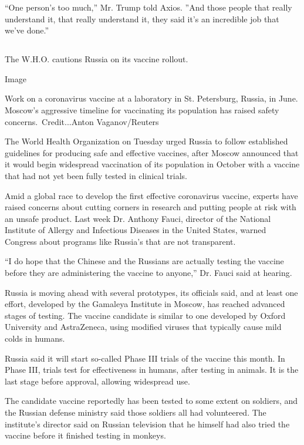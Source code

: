 ``One person's too much,'' Mr. Trump told Axios. ''And those people that
really understand it, that really understand it, they said it's an
incredible job that we've done.''

\hypertarget{-5}{%
\subsection{}\label{-5}}

The W.H.O. cautions Russia on its vaccine rollout.

Image

Work on a coronavirus vaccine at a laboratory in St. Petersburg, Russia,
in June. Moscow's aggressive timeline for vaccinating its population has
raised safety concerns.~Credit...Anton Vaganov/Reuters

The World Health Organization on Tuesday urged Russia to follow
established guidelines for producing safe and effective vaccines, after
Moscow announced that it would begin widespread vaccination of its
population in October with a vaccine that had not yet been fully tested
in clinical trials.

Amid a global race to develop the first effective coronavirus vaccine,
experts have raised concerns about cutting corners in research and
putting people at risk with an unsafe product. Last week Dr. Anthony
Fauci, director of the National Institute of Allergy and Infectious
Diseases in the United States, warned Congress about programs like
Russia's that are not transparent.

``I do hope that the Chinese and the Russians are actually testing the
vaccine before they are administering the vaccine to anyone,'' Dr. Fauci
said at hearing.

Russia is moving ahead with several prototypes, its officials said, and
at least one effort, developed by the Gamaleya Institute in Moscow, has
reached advanced stages of testing. The vaccine candidate is similar to
one developed by Oxford University and AstraZeneca, using modified
viruses that typically cause mild colds in humans.

Russia said it will start so-called Phase III trials of the vaccine this
month. In Phase III, trials test for effectiveness in humans, after
testing in animals. It is the last stage before approval, allowing
widespread use.

The candidate vaccine reportedly has been tested to some extent on
soldiers, and the Russian defense ministry said those soldiers all had
volunteered. The institute's director said on Russian television that he
himself had also tried the vaccine before it finished testing in
monkeys.

